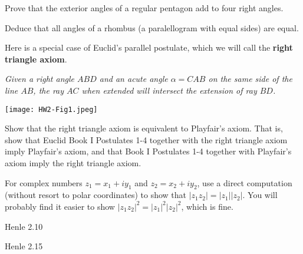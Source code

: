 \documentclass[minion]{homework}
\begin{document}
\begin{problems}

\problem Prove that the exterior angles of a regular pentagon add to four right angles.

\problem Deduce that all angles of a rhombus (a paralellogram with equal sides) are equal.

\problem Here is a special case of Euclid's parallel postulate, which we will call the
\textbf{right triangle axiom}.

\textit{Given a right angle $ABD$ and an acute angle $\alpha = CAB$ on the same side of the line $AB$,
the ray $AC$ when extended will intersect the extension of ray $BD$.}


\hfil\texttt{[image: HW2-Fig1.jpeg]}

Show that the right triangle axiom is equivalent to Playfair's axiom. That is, show that Euclid Book I Postulates 1-4 together with the right triangle axiom imply Playfair's axiom, and that 
Book I Postulates 1-4 together with Playfair's axiom imply the right triangle axiom.

\problem For complex numbers $z_1=x_1+iy_1$ and $z_2=x_2+iy_2$, use a direct computation (without resort to polar coordinates) to show that $|z_1z_2|=|z_1||z_2|$.
You will probably find it easier to show
$|z_1z_2|^2=|z_1|^2|z_2|^2$, which is fine.

\problem Henle 2.10

\problem Henle 2.15

\end{problems}
\end{document}
